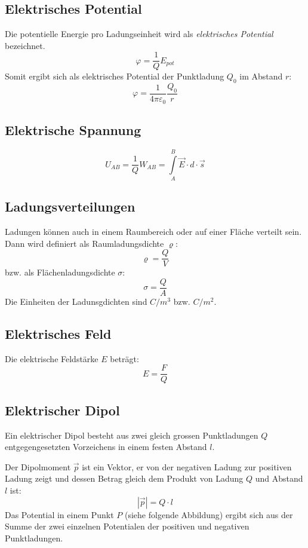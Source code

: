 \subsection{Elektrisches Potential}

Die potentielle Energie pro Ladungseinheit wird als \textit{elektrisches
Potential} bezeichnet.
\[
	\varphi = \frac{1}{Q} E_{pot}
\]
Somit ergibt sich als elektrisches Potential der Punktladung $Q_0$ im Abstand $r$:
\[
	\varphi = \frac{1}{4\pi\varepsilon_0} \frac{Q_0}{r}
\]

\subsection{Elektrische Spannung}
\[
	U_{AB} = \frac{1}{Q} W_{AB} = \int\limits^B_A \vec{E} \cdot d \cdot \vec{s}
\]

\subsection{Ladungsverteilungen}

Ladungen können auch in einem Raumbereich oder auf einer Fläche verteilt sein.
Dann wird definiert als Raumladungsdichte $\varrho$:
\[
	\varrho = \frac{Q}{V}
\]
bzw. als Flächenladungsdichte $\sigma$:
\[
	\sigma = \frac{Q}{A}
\]
Die Einheiten der Ladunsgdichten sind $C/m^3$ bzw. $C/m^2$.

\subsection{Elektrisches Feld}

Die elektrische Feldstärke $E$ beträgt:
\[
	E = \frac{F}{Q}
\]

\subsection{Elektrischer Dipol}

Ein elektrischer Dipol besteht aus zwei gleich grossen Punktladungen $Q$
entgegengesetzten Vorzeichens in einem festen Abstand $l$.

Der Dipolmoment $\vec{p}$ ist ein Vektor, er von der negativen Ladung zur
positiven Ladung zeigt und dessen Betrag gleich dem Produkt von Ladung $Q$ und
Abstand $l$ ist:
\[
	|\vec{p}| = Q \cdot l
\]
Das Potential in einem Punkt $P$ (siehe folgende Abbildung) ergibt sich aus der
Summe der zwei einzelnen Potentialen der positiven und negativen Punktladungen.

\begin{center}

\end{center}

